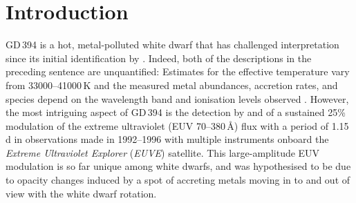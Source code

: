 \documentclass{aastex63}
\begin{document}
\keywords{}


\section{Introduction} \label{sec:intro}
GD\,394 is a hot, metal-polluted white dwarf that has challenged interpretation since its initial identification by \citet{giclasetal67-1}. Indeed, both of the descriptions in the preceding sentence are unquantified: Estimates for the effective temperature vary from 33000--41000\,K \citep{lajoie+bergeron07-1, barstowetal96-1} and the measured metal abundances, accretion rates, and species depend on the wavelength band and ionisation levels observed \citep{wilsonetal19-1}. However, the most intriguing aspect of GD\,394 is the detection by \citet{christianetal99-1} and \citet{dupuisetal00-1} of a sustained 25\% modulation of the extreme ultraviolet (EUV 70--380\,\AA) flux with a period of 1.15\,d in observations made in 1992--1996 with multiple instruments onboard the {\em Extreme Ultraviolet Explorer} ({\em EUVE}) satellite. This large-amplitude EUV modulation is so far unique among white dwarfs, and was hypothesised to be due to opacity changes induced by a spot of accreting metals moving in to and out of view with the white dwarf rotation. 
\end{document}
